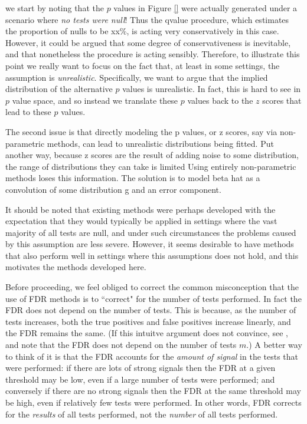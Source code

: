 \documentclass[11pt]{article}
\def\qvalue{{\tt qvalue}\xspace}
\def\locfdr{{\tt locfdr}\xspace}
\begin{document}
we start by noting that the $p$ values in Figure \ref{} were actually generated under a scenario where
{\it no tests were null}! Thus the qvalue procedure, which estimates the proportion of nulls to be xx\%, is acting very conservatively in this case.
However, it could be argued that some degree of conservativeness is inevitable, and that nonetheless the procedure is acting sensibly.
Therefore, to illustrate this point we really want to focus on the fact that, at least in some settings, the assumption is {\it unrealistic}.
Specifically, we want to argue that the implied distribution of the alternative $p$ values is unrealistic. In fact, this is hard to see in $p$ value space,
and so instead we translate these $p$ values back to the $z$ scores that lead to these $p$ values.



The second issue is that directly modeling the p values, or z scores, say via non-parametric methods, 
can lead to unrealistic distributions being fitted. Put another way, because z scores are the result of adding noise to some
distribution, the range of distributions they can take is limited Using entirely non-parametric methods loses this information.
The solution is to model beta hat as a convolution of some distribution g and an error component.


It should be noted that existing methods were perhaps developed with the expectation that they would typically 
be applied in settings where the vast majority of all tests are null, and under such circumstances
the problems caused by this assumption are less severe. However, it seems desirable to have methods that
also perform well in settings where  this assumptions does not hold, and this motivates the methods developed here.



  
  
 Before proceeding, we feel obliged to correct the common misconception
 that the use of FDR methods is to ``correct" for the number of tests performed. In fact the FDR does
 not depend on the number of tests. This is because, as the number of tests increases, both the true positives and false positives increase linearly,
 and the FDR remains the same. (If this intuitve argument does not convince, see \cite{storey.xx}, and note that the FDR does not depend on the number of tests $m$.)
  A better way to think of it is that the FDR accounts for the {\it amount of signal} in the tests that were performed: 
 if there are lots of strong signals then the FDR at a given threshold may be low, even if a large number of tests were performed; and conversely
 if there are no strong signals then the FDR at the same threshold may be high, even if relatively few tests were performed. 
 In other words, FDR corrects for the {\it results} of all tests performed, not the {\it number} of all tests performed.
 
\end{document}
